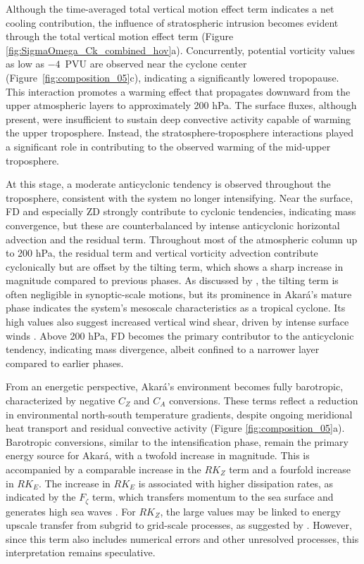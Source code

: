 \documentclass[pdflatex,sn-chicago]{sn-jnl}%
\theoremstyle{plain}
\theoremstyle{definition}
\theoremstyle{remark}
\theoremstyle{definition}
\begin{document}
Although the time-averaged total vertical motion effect term indicates a net cooling contribution, the influence of stratospheric intrusion becomes evident through the total vertical motion effect term (Figure \ref{fig:SigmaOmega_Ck_combined_hov}a). Concurrently, potential vorticity values as low as $-4$~PVU are observed near the cyclone center (Figure~\ref{fig:composition_05}c), indicating a significantly lowered tropopause. This interaction promotes a warming effect that propagates downward from the upper atmospheric layers to approximately 200 hPa. The surface fluxes, although present, were insufficient to sustain deep convective activity capable of warming the upper troposphere. Instead, the stratosphere-troposphere interactions played a significant role in contributing to the observed warming of the mid-upper troposphere.

At this stage, a moderate anticyclonic tendency is observed throughout the troposphere, consistent with the system no longer intensifying. Near the surface, FD and especially ZD strongly contribute to cyclonic tendencies, indicating mass convergence, but these are counterbalanced by intense anticyclonic horizontal advection and the residual term. Throughout most of the atmospheric column up to 200 hPa, the residual term and vertical vorticity advection contribute cyclonically but are offset by the tilting term, which shows a sharp increase in magnitude compared to previous phases. As discussed by \citet{dutra2017structure}, the tilting term is often negligible in synoptic-scale motions, but its prominence in Akará's mature phase indicates the system's mesoscale characteristics as a tropical cyclone. Its high values also suggest increased vertical wind shear, driven by intense surface winds \citep{reboita2024assessment}. Above 200 hPa, FD becomes the primary contributor to the anticyclonic tendency, indicating mass divergence, albeit confined to a narrower layer compared to earlier phases.

From an energetic perspective, Akará's environment becomes fully barotropic, characterized by negative $C_Z$ and $C_A$ conversions. These terms reflect a reduction in environmental north-south temperature gradients, despite ongoing meridional heat transport and residual convective activity (Figure \ref{fig:composition_05}a). Barotropic conversions, similar to the intensification phase, remain the primary energy source for Akará, with a twofold increase in magnitude. This is accompanied by a comparable increase in the $RK_Z$ term and a fourfold increase in $RK_E$. The increase in $RK_E$ is associated with higher dissipation rates, as indicated by the $F_{\zeta}$ term, which transfers momentum to the sea surface and generates high sea waves \citep[e.g.,]{zhao2022effects,shimura2024footprint}. For $RK_Z$, the large values may be linked to energy upscale transfer from subgrid to grid-scale processes, as suggested by \citet{michaelides1987limited}. However, since this term also includes numerical errors and other unresolved processes, this interpretation remains speculative. 
\end{document}
